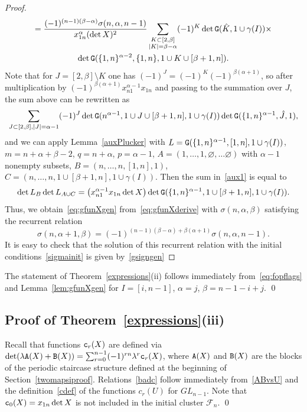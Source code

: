 \documentclass{amsart}
\theoremstyle{definition}
\theoremstyle{remark}
\numberwithin{equation}{section}
\numberwithin{theorem}{section}
\def\FF{{\mathcal F}}
\def\NA{{\tt A}}
\def\NB{{\tt B}}
\def\NG{{\tt G}}
\def\pu{\varnothing}
\def\ec{{\tt c}}
\begin{document}
\begin{proof}
\begin{multline}
= \frac{(-1)^{(n-1)(\beta-\alpha)}\sigma(n,\alpha,n-1)}{x_{1n}^{\alpha}(\det X)^2}  
\sum_{\substack{K \subset [2,\beta]\\ |K| = \beta -\alpha}} (-1)^K
\det\NG( \hat K,1\cup \gamma(I))\times\\
\det\NG(\{1,n\}^{\alpha-2},\{1,n\},1\cup K\cup[\beta +1, n]).
\end{multline}
Note that for $J=[2,\beta]\setminus K$ one has $(-1)^J=(-1)^K(-1)^{\beta(\alpha+1)}$, so
after multiplication by $(-1)^{\beta(\alpha+1)}x_{n1}^{\alpha-1} x_{1n}$ and passing to the summation over
$J$, the sum above can be rewritten as
\begin{equation}
\label{aux1}
\sum_{J \subset [2,\beta], |J| = \alpha-1} (-1)^J
\det\NG(n^{\alpha-1}, 1\cup J\cup [\beta+1,n],  1\cup \gamma(I))\det\NG(\{1,n\}^{\alpha-1},\hat J, 1), 
\end{equation}
and we can apply Lemma~\ref{auxPlucker} with $L= \NG(\{1,n\}^{\alpha-1}, [1, n], 1\cup \gamma(I) )$,
$m = n+\alpha +\beta - 2$, $q = n+\alpha$, $p=\alpha -1$, $A=(1,\dots,1,\pu,\dots\pu)$ with $\alpha-1$ nonempty subsets, 
$B=(n,\dots,n, [1, n], 1)$, $C= (n,\dots,n, 1\cup [\beta+1,n], 1\cup \gamma(I) )$. Then the sum in~\eqref{aux1} is equal to
\[
 \det L_B  \det L_{A\cup C}  =  \left (x_{n1}^{\alpha-1} x_{1n} \det X\right ) 
\det\NG(\{1,n\}^{\alpha-1}, 1\cup [\beta+1,n], 1\cup  \gamma(I)).
\]
Thus, we obtain~\eqref{eq:gfunXgen}  from~\eqref{eq:gfunXderive} with $\sigma(n,\alpha,\beta)$ satisfying the recurrent
relation
\begin{equation*}
\sigma(n, \alpha +1,\beta)= (-1)^{(n-1)(\beta-\alpha)+\beta(\alpha+1)}\sigma(n,\alpha,n-1).
\end{equation*}
It is easy to check that the solution of this recurrent relation with the initial conditions~\eqref{sigmainit} is given 
by~\eqref{gsigngen}
\end{proof}

The statement of Theorem~\ref{expressions}(ii) follows immediately from~\eqref{eq:fopflags} and Lemma~\ref{lem:gfunXgen}
for $I=[i,n-1]$, $\alpha=j$, $\beta=n-1-i+j$. \qed

\subsection{Proof of Theorem~\ref{expressions}(iii)} Recall that functions $\ec_r(X)$ are defined via 
$\det(\lambda\NA(X)+\NB(X))=\sum_{r=0}^{n-1}(-1)^{rn}\lambda^r\ec_r(X)$, where $\NA(X)$ and $\NB(X)$ are the blocks of the periodic staircase structure defined at the beginning of Section~\ref{twomapsiproof}. Relations~\eqref{badc}
follow immediately from~\eqref{ABvsU} and the definition~\eqref{cdef} of the functions $c_r(U)$ for $GL_{n-1}$. Note that $\ec_0(X)=x_{1n}\det X$ is not included in the initial cluster $\FF_n$. \qed
\end{document}
